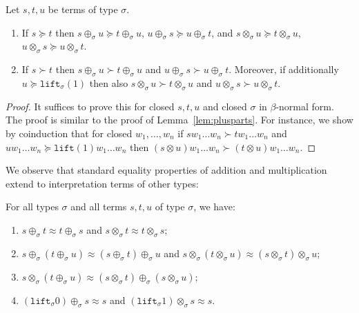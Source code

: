 \documentclass[runningheads,a4paper]{llncs}
\newcommand{\lift}{\mathtt{lift}}
\begin{document}
\begin{lemma}\label{lem:plustimesmonotonic}
  Let $s,t,u$ be terms of type $\sigma$.
  \begin{enumerate}
  \item If $s \succeq t$ then $s \oplus_\sigma u \succeq t
    \oplus_\sigma u$, $u \oplus_\sigma s \succeq u \oplus_\sigma t$,
    and $s \otimes_\sigma u \succeq t \otimes_\sigma u$, $u
    \otimes_\sigma s \succeq u \otimes_\sigma t$.
  \item If $s \succ t$ then $s \oplus_\sigma u \succ t \oplus_\sigma
    u$ and $u \oplus_\sigma s \succ u \oplus_\sigma t$. Moreover, if
    additionally $u \succeq \lift_\sigma(1)$ then also $s
    \otimes_\sigma u \succ t \otimes_\sigma u$ and $u \otimes_\sigma s
    \succ u \otimes_\sigma t$.
  \end{enumerate}
\end{lemma}

\begin{proof}
  It suffices to prove this for closed $s,t,u$ and closed $\sigma$ in
  $\beta$-normal form. The proof is similar to the proof of
  Lemma~\ref{lem:plusparts}. For instance, we show by coinduction that
  for closed $w_1,\ldots,w_n$ if $s w_1 \ldots w_n \succ t w_1 \ldots
  w_n$ and $u w_1 \ldots w_n \succeq \lift(1) w_1 \ldots w_n$ then $(s
  \otimes u) w_1 \ldots w_n \succ (t \otimes u) w_1 \ldots w_n$.
\end{proof}

We observe that standard equality properties of addition and
multiplication extend to interpretation terms of other types:

\begin{lemma}\label{lem:approxproperties}
For all types $\sigma$ and all terms $s,t,u$ of type $\sigma$, we
have:
\begin{enumerate}
\item\label{lem:approx:symmetry} $s \oplus_\sigma t \approx t
  \oplus_\sigma s$ and $s \otimes_\sigma t \approx t \otimes_\sigma
  s$;
\item\label{lem:approx:assoc} $s \oplus_\sigma (t \oplus_\sigma u)
  \approx (s \oplus_\sigma t) \oplus_\sigma u$ and $s \otimes_\sigma
  (t \otimes_\sigma u) \approx (s \otimes_\sigma t) \otimes_\sigma u$;
\item\label{lem:approx:distribution} $s \otimes_\sigma (t
  \oplus_\sigma u) \approx (s \otimes_\sigma t) \oplus_\sigma (s
  \otimes_\sigma u)$;
\item\label{lem:approx:neutral} $(\lift_\sigma 0) \oplus_\sigma s
  \approx s$ and $(\lift_\sigma 1) \otimes_\sigma s \approx s$.
\end{enumerate}
\end{lemma}
\end{document}
